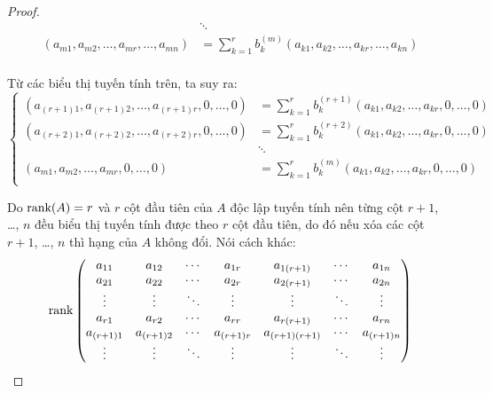 \documentclass[class=nhvh-linear-algebra,crop=false]{standalone}
\begin{document}
\begin{proof}
\begin{align*}
                                                                         & \ddots                                                                        \\
        (a_{m1}, a_{m2}, \ldots, a_{mr}, \ldots, a_{mn})                 & = \sum^{r}_{k=1}b_{k}^{(m)}(a_{k1}, a_{k2}, \ldots, a_{kr}, \ldots, a_{kn})   \\
    \end{align*}
    \par Từ các biểu thị tuyến tính trên, ta suy ra:
    \[
        \begin{cases}
            (a_{(r+1)1}, a_{(r+1)2}, \ldots, a_{(r+1)r}, 0, \ldots, 0) & = \sum^{r}_{k=1}b_{k}^{(r+1)}(a_{k1}, a_{k2}, \ldots, a_{kr}, 0, \ldots, 0) \\
            (a_{(r+2)1}, a_{(r+2)2}, \ldots, a_{(r+2)r}, 0, \ldots, 0) & = \sum^{r}_{k=1}b_{k}^{(r+2)}(a_{k1}, a_{k2}, \ldots, a_{kr}, 0, \ldots, 0) \\
                                                                       & \ddots                                                                      \\
            (a_{m1}, a_{m2}, \ldots, a_{mr}, 0, \ldots, 0)             & = \sum^{r}_{k=1}b_{k}^{(m)}(a_{k1}, a_{k2}, \ldots, a_{kr}, 0, \ldots, 0)   \\
        \end{cases}
        \tag{$\star$}
    \]
    \par Do $\text{rank}(A) = r$ và $r$ cột đầu tiên của $A$ độc lập tuyến tính nên từng cột $r+1$, \ldots, $n$ đều biểu thị tuyến tính được theo $r$ cột đầu tiên, do đó nếu xóa các cột $r+1$, \ldots, $n$ thì hạng của $A$ không đổi. Nói cách khác:
    \[
        \text{rank}
        \begin{pmatrix}
            a_{11}     & a_{12}     & \cdots & a_{1r}     & a_{1(r+1)}     & \cdots & a_{1n}     \\
            a_{21}     & a_{22}     & \cdots & a_{2r}     & a_{2(r+1)}     & \cdots & a_{2n}     \\
            \vdots     & \vdots     & \ddots & \vdots     & \vdots         & \ddots & \vdots     \\
            a_{r1}     & a_{r2}     & \cdots & a_{rr}     & a_{r(r+1)}     & \cdots & a_{rn}     \\
            a_{(r+1)1} & a_{(r+1)2} & \cdots & a_{(r+1)r} & a_{(r+1)(r+1)} & \cdots & a_{(r+1)n} \\
            \vdots     & \vdots     & \ddots & \vdots     & \vdots         & \ddots & \vdots     \\

\end{pmatrix}\]
\end{proof}
\end{document}
